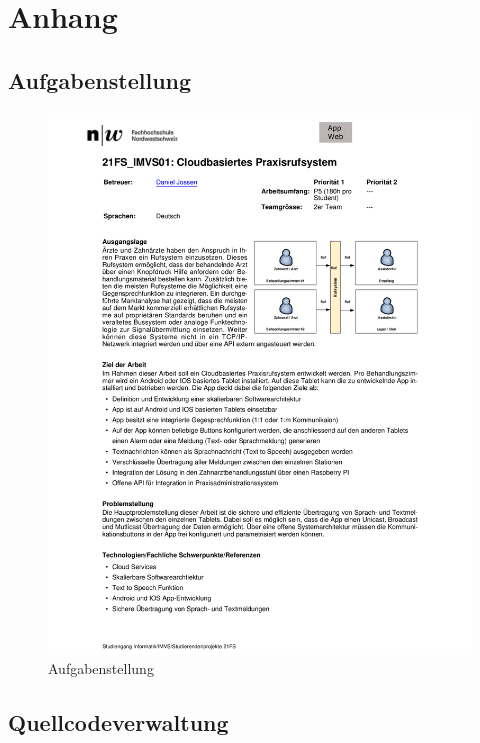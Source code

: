 
\renewcommand\refname{Literaturverzeichnis}
\printbibliography
\cleardoublepage
\listoffigures


\clearpage

\section{Anhang}
    \subsection{Aufgabenstellung}
        \begin{figure}[h]
            \centering
            \begin{minipage}[b]{0.8\textwidth}
                \includegraphics[width=\textwidth]{graphics/aufgabenstellung}
                \caption{Aufgabenstellung}
            \end{minipage}
        \end{figure}

    \clearpage
    \subsection{Quellcodeverwaltung}

